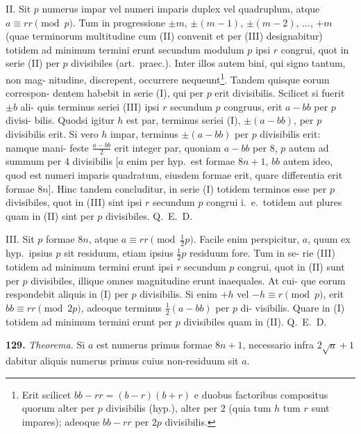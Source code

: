 \documentclass[12pt,a4paper]{article}
\begin{document}
II. Sit $p$ numerus impar vel numeri imparis duplex vel quadruplum, atque
$a \equiv rr \pmod{p}$. Tum in progressione $\pm m$, $\pm(m-1)$, $\pm(m-2)$, $\ldots$, $+m$
(quae terminorum multitudine cum (II) convenit et per (III) designabitur) totidem
ad minimum termini erunt secundum modulum $p$ ipsi $r$ congrui, quot in serie (II)
per $p$ divisibiles (art.~praec.). Inter illos autem bini, qui signo tantum, non mag-
nitudine, discrepent, occurrere nequeunt\footnote{Erit scilicet $bb - rr = (b-r)(b+r)$ e duobus factoribus compositus quorum alter per $p$ divisibilis (hyp.), alter per $2$ (quia tum $h$ tum $r$ sunt impares); adeoque $bb - rr$ per $2p$ divisibilis.}. Tandem quisque eorum correspon-
dentem habebit in serie (I), qui per $p$ erit divisibilis. Scilicet si fuerit $\pm b$ ali-
quis terminus seriei (III) ipsi $r$ secundum $p$ congruus, erit $a - bb$ per $p$ divisi-
bilis. Quodsi igitur $h$ est par, terminus seriei (I), $\pm(a - bb)$, per $p$ divisibilis
erit. Si vero $h$ impar, terminus $\pm(a - bb)$ per $p$ divisibilis erit: namque mani-
feste $\frac{a-bb}{2}$ erit integer par, quoniam $a - bb$ per $8$, $p$ autem ad summum per
$4$ divisibilis [$a$ enim per hyp.\ est formae $8n+1$, $bb$ autem ideo, quod est numeri
imparis quadratum, eiusdem formae erit, quare differentia erit formae $8n$]. Hinc
tandem concluditur, in serie (I) totidem terminos esse per $p$ divisibiles, quot in
(III) sint ipsi $r$ secundum $p$ congrui i.~e.\ totidem aut plures quam in (II) sint
per $p$ divisibiles. Q.~E.~D.

III. Sit $p$ formae $8n$, atque $a \equiv rr \pmod{\frac{1}{2}p}$. Facile enim perspicitur, $a$,
quum ex hyp.\ ipsius $p$ sit residuum, etiam ipsius $\frac{1}{2}p$ residuum fore. Tum in se-
rie (III) totidem ad minimum termini erunt ipsi $r$ secundum $p$ congrui, quot in
(II) sunt per $p$ divisibiles, illique omnes magnitudine erunt inaequales. At cui-
que eorum respondebit aliquis in (I) per $p$ divisibilis. Si enim $+h$ vel $-h \equiv
r \pmod{p}$, erit $bb \equiv rr \pmod{2p}$, adeoque terminus $\frac{1}{2}(a - bb)$ per $p$ di-
visibilis. Quare in (I) totidem ad minimum termini erunt per $p$ divisibiles
quam in (II). Q.~E.~D.

\textbf{129.}
\textit{Theorema.} Si $a$ est numerus primus formae $8n+1$, necessario infra $2\sqrt{a}+1$
dabitur aliquis numerus primus cuius non-residuum sit $a$.
\end{document}
